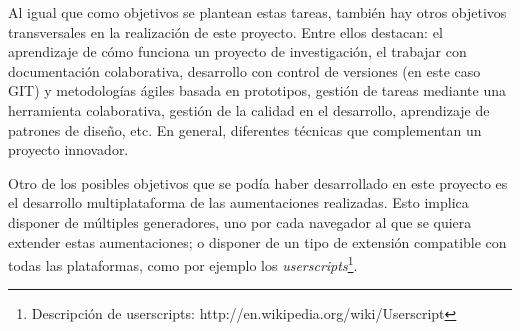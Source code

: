 Al igual que como objetivos se plantean estas tareas, también hay otros objetivos transversales en la realización de este proyecto. Entre ellos destacan: el aprendizaje de cómo funciona un proyecto de investigación, el trabajar con documentación colaborativa, desarrollo con control de versiones (en este caso GIT) y metodologías ágiles basada en prototipos, gestión de tareas mediante una herramienta colaborativa, gestión de la calidad en el desarrollo, aprendizaje de patrones de diseño, etc. En general, diferentes técnicas que complementan un proyecto innovador.

Otro de los posibles objetivos que se podía haber desarrollado en este proyecto es el desarrollo multiplataforma de las aumentaciones realizadas. Esto implica disponer de múltiples generadores, uno por cada navegador al que se quiera extender estas aumentaciones; o disponer de un tipo de extensión compatible con todas las plataformas, como por ejemplo los \emph{userscripts}\footnote{Descripción de userscripts: http://en.wikipedia.org/wiki/Userscript}.